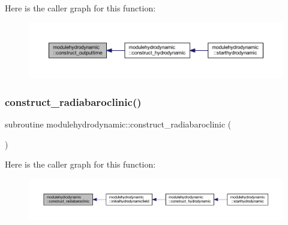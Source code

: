 Here is the caller graph for this function\+:\nopagebreak
\begin{figure}[H]
\begin{center}
\leavevmode
\includegraphics[width=350pt]{namespacemodulehydrodynamic_aea0ceff2b860562b897884814ae392d9_icgraph}
\end{center}
\end{figure}
\mbox{\label{namespacemodulehydrodynamic_a2c1b59ad00ab5b15fcde63fd663d2f54}} 
\subsubsection{\texorpdfstring{construct\+\_\+radiabaroclinic()}{construct\_radiabaroclinic()}}
{\footnotesize\ttfamily subroutine modulehydrodynamic\+::construct\+\_\+radiabaroclinic (\begin{DoxyParamCaption}{ }\end{DoxyParamCaption})\hspace{0.3cm}{\ttfamily [private]}}

Here is the caller graph for this function\+:\nopagebreak
\begin{figure}[H]
\begin{center}
\leavevmode
\includegraphics[width=350pt]{namespacemodulehydrodynamic_a2c1b59ad00ab5b15fcde63fd663d2f54_icgraph}
\end{center}
\end{figure}
\mbox{\label{namespacemodulehydrodynamic_acaa5f838138b21f2c4d3c245177ae6bf}} 
